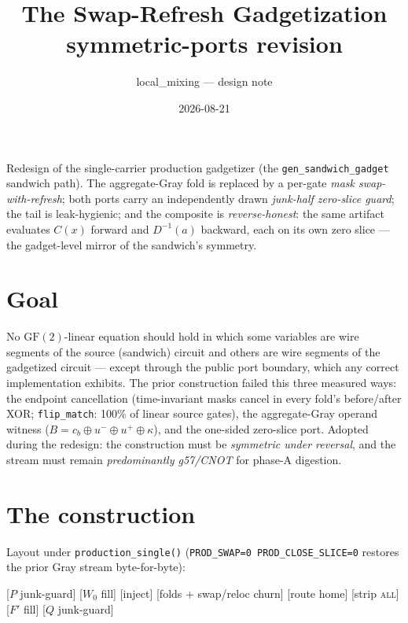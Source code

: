 \documentclass[11pt]{article}
\title{The Swap-Refresh Gadgetization\\[2pt]\large symmetric-ports revision}
\author{local\_mixing --- design note}
\date{2026-08-21}
\newcommand{\XOR}{\oplus}
\begin{document}
\maketitle

\noindent
Redesign of the single-carrier production gadgetizer (the
\texttt{gen\_sandwich\_gadget} sandwich path). The aggregate-Gray fold is
replaced by a per-gate \emph{mask swap-with-refresh}; both ports carry an
independently drawn \emph{junk-half zero-slice guard}; the tail is
leak-hygienic; and the composite is \emph{reverse-honest}: the same
artifact evaluates $C(x)$ forward and $D^{-1}(a)$ backward, each on its
own zero slice --- the gadget-level mirror of the sandwich's symmetry.

\section{Goal}

No $\mathrm{GF}(2)$-linear equation should hold in which some variables
are wire segments of the source (sandwich) circuit and others are wire
segments of the gadgetized circuit --- except through the public port
boundary, which any correct implementation exhibits. The prior
construction failed this three measured ways: the endpoint cancellation
(time-invariant masks cancel in every fold's before/after XOR;
\texttt{flip\_match}: 100\% of linear source gates), the aggregate-Gray
operand witness ($B = c_b \XOR u^{-} \XOR u^{+} \XOR \kappa$), and the
one-sided zero-slice port. Adopted during the redesign: the construction
must be \emph{symmetric under reversal}, and the stream must remain
\emph{predominantly g57/CNOT} for phase-A digestion.

\section{The construction}

\noindent Layout under \texttt{production\_single()}
(\texttt{PROD\_SWAP=0 PROD\_CLOSE\_SLICE=0} restores the prior Gray
stream byte-for-byte):
\begin{center}\small
[$P$ junk-guard] [$W_0$ fill] [inject] [folds + swap/reloc churn]
[route home] [strip \textsc{all}] [$F'$ fill] [$Q$ junk-guard]
\end{center}
\end{document}
